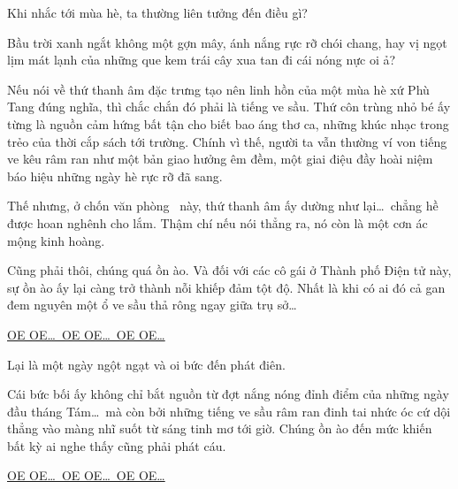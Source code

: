 \documentclass[../main.tex]{subfiles}
\begin{document}


Khi nhắc tới mùa hè, ta thường liên tưởng đến điều gì?

Bầu trời xanh ngắt không một gợn mây, ánh nắng rực rỡ chói chang, hay vị ngọt lịm mát lạnh của những que kem trái cây xua tan đi cái nóng nực oi ả?

Nếu nói về thứ thanh âm đặc trưng tạo nên linh hồn của một mùa hè xứ Phù Tang đúng nghĩa, thì chắc chắn đó phải là tiếng ve sầu. Thứ côn trùng nhỏ bé ấy từng là nguồn cảm hứng bất tận cho biết bao áng thơ ca, những khúc nhạc trong trẻo của thời cắp sách tới trường. Chính vì thế, người ta vẫn thường ví von tiếng ve kêu râm ran như một bản giao hưởng êm đềm, một giai điệu đầy hoài niệm báo hiệu những ngày hè rực rỡ đã sang.

Thế nhưng, ở chốn văn phòng \hll\ này, thứ thanh âm ấy dường như lại\dots\ chẳng hề được hoan nghênh cho lắm. Thậm chí nếu nói thẳng ra, nó còn là một cơn ác mộng kinh hoàng.

Cũng phải thôi, chúng quá ồn ào. Và đối với các cô gái ở Thành phố Điện tử này, sự ồn ào ấy lại càng trở thành nỗi khiếp đảm tột độ. Nhất là khi có ai đó cả gan đem nguyên một ổ ve sầu thả rông ngay giữa trụ sở\dots

\begin{center}
  \uline{OE OE\dots\ OE OE\dots\ OE OE\dots}
\end{center}

Lại là một ngày ngột ngạt và oi bức đến phát điên.

Cái bức bối ấy không chỉ bắt nguồn từ đợt nắng nóng đỉnh điểm của những ngày đầu tháng Tám\dots\ mà còn bởi những tiếng ve sầu râm ran đinh tai nhức óc cứ dội thẳng vào màng nhĩ suốt từ sáng tinh mơ tới giờ. Chúng ồn ào đến mức khiến bất kỳ ai nghe thấy cũng phải phát cáu.

\begin{center}
  \uline{OE OE\dots\ OE OE\dots\ OE OE\dots}
\end{center}
\end{document}
